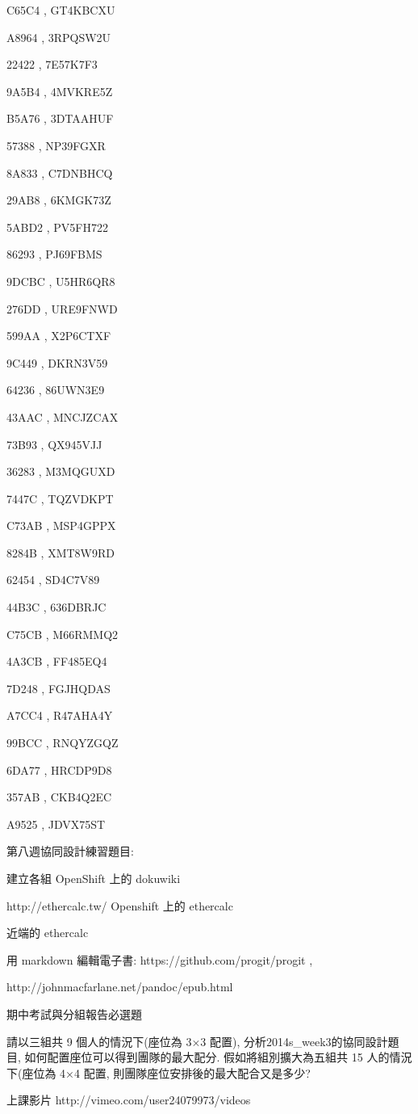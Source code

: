 \documentclass[]{article}
\begin{document}
C65C4 , GT4KBCXU

A8964 , 3RPQSW2U

22422 , 7E57K7F3

9A5B4 , 4MVKRE5Z

B5A76 , 3DTAAHUF

57388 , NP39FGXR

8A833 , C7DNBHCQ

29AB8 , 6KMGK73Z

5ABD2 , PV5FH722

86293 , PJ69FBMS

9DCBC , U5HR6QR8

276DD , URE9FNWD

599AA , X2P6CTXF

9C449 , DKRN3V59

64236 , 86UWN3E9

43AAC , MNCJZCAX

73B93 , QX945VJJ

36283 , M3MQGUXD

7447C , TQZVDKPT

C73AB , MSP4GPPX

8284B , XMT8W9RD

62454 , SD4C7V89

44B3C , 636DBRJC

C75CB , M66RMMQ2

4A3CB , FF485EQ4

7D248 , FGJHQDAS

A7CC4 , R47AHA4Y

99BCC , RNQYZGQZ

6DA77 , HRCDP9D8

357AB , CKB4Q2EC

A9525 , JDVX75ST

第八週協同設計練習題目:

建立各組 OpenShift 上的 dokuwiki

http://ethercalc.tw/ Openshift 上的 ethercalc

近端的 ethercalc

用 markdown 編輯電子書: https://github.com/progit/progit ,

http://johnmacfarlane.net/pandoc/epub.html

期中考試與分組報告必選題

請以三組共 9 個人的情況下(座位為 3×3 配置),
分析2014s\_week3的協同設計題目, 如何配置座位可以得到團隊的最大配分.
假如將組別擴大為五組共 15 人的情況下(座位為 4×4 配置,
則團隊座位安排後的最大配合又是多少?

上課影片 http://vimeo.com/user24079973/videos
\end{document}
